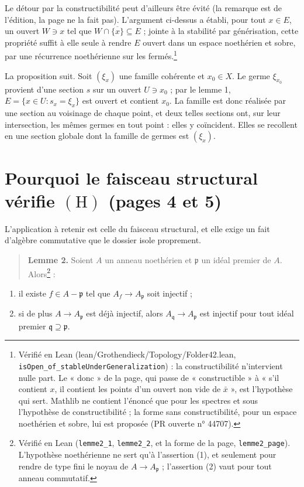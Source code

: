 \documentclass[11pt,a4paper]{article}
\begin{document}
Le détour par la constructibilité peut d'ailleurs être évité (la remarque est
de l'édition, la page ne la fait pas). L'argument ci-dessus a établi, pour
tout $x \in E$, un ouvert $W \ni x$ tel que $W \cap \overline{\{x\}}
\subseteq E$ ; jointe à la stabilité par générisation, cette propriété suffit
à elle seule à rendre $E$ ouvert dans un espace noethérien et sobre, par une
récurrence noethérienne sur les fermés.\footnote{Vérifié en Lean
(lean/Grothendieck/Topology/Folder42.lean,
\texttt{isOpen\_of\_stableUnderGeneralization}) : la constructibilité
n'intervient nulle part. Le « donc » de la page, qui passe de
« constructible » à « s'il contient $x$, il contient les points d'un ouvert
non vide de $\bar x$ », est l'hypothèse qui sert. Mathlib ne
contient l'énoncé que pour les spectres et sous l'hypothèse de
constructibilité ; la forme sans constructibilité, pour un espace
noethérien et sobre, lui est proposée (PR ouverte n° 44707).}

La proposition suit. Soit $(\xi_x)$ une famille cohérente et $x_0 \in X$. Le
germe $\xi_{x_0}$ provient d'une section $s$ sur un ouvert $U \ni x_0$ ; par
le lemme 1, $E = \{x \in U : s_x = \xi_x\}$ est ouvert et contient $x_0$. La
famille est donc réalisée par une section au voisinage de chaque point, et
deux telles sections ont, sur leur intersection, les mêmes germes en tout
point : elles y coïncident. Elles se recollent en une section globale dont la
famille de germes est $(\xi_x)$.

\section*{Pourquoi le faisceau structural vérifie $(\mathrm{H})$ (pages 4 et 5)}

L'application à retenir est celle du faisceau structural, et elle exige un
fait d'algèbre commutative que le dossier isole proprement.

\begin{quote}
\textbf{Lemme 2.} Soient $A$ un anneau noethérien et $\mathfrak p$ un idéal
premier de $A$. Alors\footnote{Vérifié en Lean (\texttt{lemme2\_1},
\texttt{lemme2\_2}, et la forme de la page, \texttt{lemme2\_page}).
L'hypothèse noethérienne ne sert qu'à l'assertion (1), et seulement pour
rendre de type fini le noyau de $A \to A_{\mathfrak p}$ ; l'assertion (2)
vaut pour tout anneau commutatif.} :
\end{quote}

\begin{enumerate}
\item il existe $f \in A - \mathfrak p$ tel que $A_f \to A_{\mathfrak p}$ soit
      injectif ;
\item si de plus $A \to A_{\mathfrak p}$ est déjà injectif, alors
      $A_{\mathfrak q} \to A_{\mathfrak p}$ est injectif pour tout idéal
      premier $\mathfrak q \supseteq \mathfrak p$.
\end{enumerate}
\end{document}
